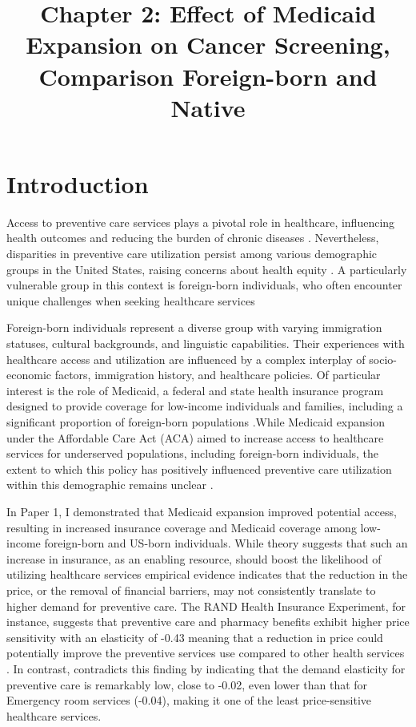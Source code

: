 \documentclass[man]{apa7}
\title{Chapter 2: Effect of Medicaid Expansion on Cancer Screening, Comparison Foreign-born and Native}
\begin{document}
\maketitle


\section{Introduction}

Access to preventive care services plays a pivotal role in healthcare, influencing health outcomes and reducing the burden of chronic diseases \parencite{bloodworth_variation_2018}. 
Nevertheless, disparities in preventive care utilization persist among various demographic groups in the United States, raising concerns about health equity \parencite{goel_racial_2003}. A particularly vulnerable group in this context is foreign-born individuals, who often encounter unique challenges when seeking healthcare services \parencite{adigun_minding_2021}

Foreign-born individuals represent a diverse group with varying immigration statuses, cultural backgrounds, and linguistic capabilities. Their experiences with healthcare access and utilization are influenced by a complex interplay of socio-economic factors, immigration history, and healthcare policies. Of particular interest is the role of Medicaid, a federal and state health insurance program designed to provide coverage for low-income individuals and families, including a significant proportion of foreign-born populations \parencite{bustamante_health_2019}.While Medicaid expansion under the Affordable Care Act (ACA) aimed to increase access to healthcare services for underserved populations, including foreign-born individuals, the extent to which this policy has positively influenced preventive care utilization within this demographic remains unclear \parencite{li_gains_2021}. 

In Paper 1, I demonstrated that Medicaid expansion improved potential access,  resulting in increased insurance coverage and Medicaid coverage among low-income foreign-born and US-born individuals. While theory suggests that such an increase in insurance, as an enabling resource, should boost the likelihood of utilizing healthcare services  \parencite{davidson_framework_2004} empirical evidence indicates that the reduction in the price, or the removal of financial barriers, may not consistently translate to higher demand for preventive care. The RAND Health Insurance Experiment, for instance, suggests that preventive care and pharmacy benefits exhibit higher price sensitivity with an elasticity of -0.43 meaning that a reduction in price could potentially improve the preventive services use compared to other health services \parencite{ringel_elasticity_2002}. In contrast, \textcite{ellis_health_2017} contradicts this finding by indicating that the demand elasticity for preventive care is remarkably low, close to -0.02, even lower than that for Emergency room services (-0.04), making it one of the least price-sensitive healthcare services.
\end{document}
